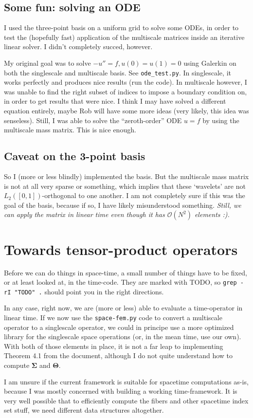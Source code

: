 \documentclass[11pt,a4paper]{amsart}
\theoremstyle{definition}
\begin{document}
\subsection{Some fun: solving an ODE}
I used the three-point basis on a uniform grid to solve some ODEs, in order
to test the (hopefully fast) application of the multiscale matrices inside an
iterative linear solver. I didn't completely succed, however.

My original goal was to solve $-u'' = f, u(0) = u(1) = 0$ using Galerkin on
both the singlescale and multiscale basis. See \texttt{ode\_test.py}. In
singlescale, it works perfectly and produces nice results (run the code). In
multiscale however, I was unable to find the right subset of indices to impose
a boundary condition on, in order to get results that were nice. I think I may
have solved a different equation entirely, maybe Rob will have some more ideas
(very likely, this idea was senseless). Still, I was able to solve the
``zeroth-order'' ODE $u = f$ by using the multiscale mass matrix. This is nice
enough.

\subsection{Caveat on the 3-point basis}
So I (more or less blindly) implemented the basis. But the multiscale mass matrix
is not at all very sparse or something, which implies that these `wavelets' are
not $L_2([0,1])$-orthogonal to one another. I am not completely sure if this was
the goal of the basis, because if so, I have likely misunderstood something.
\emph{Still, we can apply the matrix in linear time even though it has $\mathcal O(N^2)$
elements :).}

\section{Towards tensor-product operators}
Before we can do things in space-time, a small number of things have to be fixed,
or at least looked at, in the time-code. They are marked with TODO, so
\texttt{grep -rI "TODO" .} should point you in the right directions.

In any case, right now, we are (more or less) able to evaluate a time-operator
in linear time. If we now use the \texttt{space-fem.py} code to convert a
multiscale operator to a singlescale operator, we could in principe use a more
optimized library for the singlescale space operations (or, in the mean time,
use our own). With both of those elements in place, it is not a far leap to
implementing Theorem 4.1 from the document, although I do not quite understand
how to compute $\bm \Sigma$ and $\bm \Theta$.

I am unsure if the current framework is suitable for spacetime computations
as-is, because I was mostly concerned with building a working time-framework.
It is very well possible that to efficiently compute the fibers and other
spacetime index set stuff, we need different data structures altogether.
\end{document}
